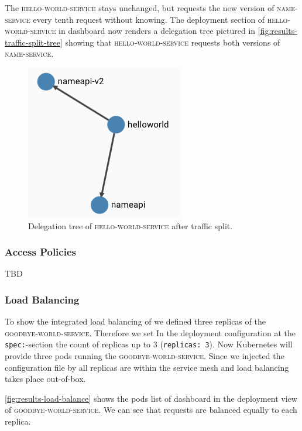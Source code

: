 The \textsc{hello-world-service} stays unchanged, but requests the new version of \textsc{name-service} every tenth request without knowing.
The deployment section of \textsc{hello-world-service} in \linkerd{} dashboard now renders a delegation tree pictured in \autoref{fig:results-traffic-split-tree} showing that \textsc{hello-world-service} requests both versions of \textsc{name-service}.

\begin{figure}
	\includegraphics[width=.4\columnwidth]{img/results-traffic-split-tree}
	\centering
	\caption{Delegation tree of \textsc{hello-world-service} after traffic split.}
	\label{fig:results-traffic-split-tree}
\end{figure}




\subsubsection{Access Policies}
TBD

\subsubsection{Load Balancing}
\label{sec:load-result}
To show the integrated load balancing of \linkerd{} we defined three replicas of the \textsc{goodbye-world-service}.
Therefore we set In the deployment configuration at the \lstinline|spec:|-section the count of replicas up to 3 (\lstinline|replicas: 3|).
Now Kubernetes will provide three pods running the \textsc{goodbye-world-service}.
Since we injected the configuration file by \linkerd{} all replicas are within the service mesh and load balancing takes place out-of-box.

\autoref{fig:results-load-balance} shows the pods list of \linkerd{} dashboard in the deployment view of \textsc{goodbye-world-service}.
We can see that requests are balanced equally to each replica.


